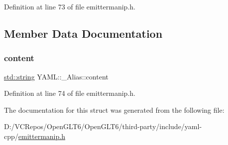Definition at line 73 of file emittermanip.\+h.



\subsection{Member Data Documentation}
\mbox{\label{struct_y_a_m_l_1_1___alias_abd333929416f264664d316fa902be42c}} 
\subsubsection{\texorpdfstring{content}{content}}
{\footnotesize\ttfamily \mbox{\hyperlink{glad_8h_ac83513893df92266f79a515488701770}{std\+::string}} Y\+A\+M\+L\+::\+\_\+\+Alias\+::content}



Definition at line 74 of file emittermanip.\+h.



The documentation for this struct was generated from the following file\+:\begin{DoxyCompactItemize}
\item 
D\+:/\+V\+C\+Repos/\+Open\+G\+L\+T6/\+Open\+G\+L\+T6/third-\/party/include/yaml-\/cpp/\mbox{\hyperlink{emittermanip_8h}{emittermanip.\+h}}\end{DoxyCompactItemize}
